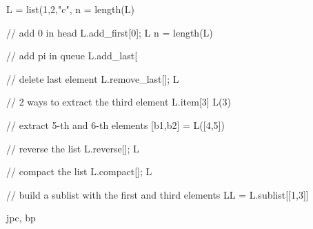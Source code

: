 \begin{examples}
  
  \begin{program}
    L = list(1,2,"c",%
    n = length(L)

    // add 0 in head
    L.add_first[0]; L
    n = length(L)

    // add pi in queue
    L.add_last[%

    // delete last element
    L.remove_last[]; L

    // 2 ways to extract the third element
    L.item[3]
    L(3)

    // extract 5-th and 6-th elements
    [b1,b2] = L([4,5])

    // reverse the list
    L.reverse[]; L

    // compact the list
    L.compact[]; L

    // build a sublist with the first and third elements
    LL = L.sublist[[1,3]]
   \end{program}
  
 \end{examples}

\begin{manseealso}
\end{manseealso}

\begin{authors}
   jpc, bp
\end{authors}
